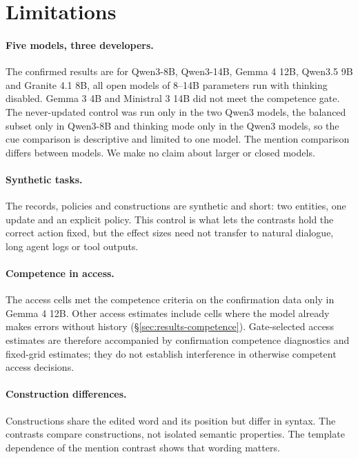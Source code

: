 \section*{Limitations}

\paragraph{Five models, three developers.} The confirmed results are for Qwen3-8B, Qwen3-14B, Gemma 4 12B,
Qwen3.5 9B and Granite 4.1 8B, all open models of 8--14B parameters run with thinking disabled. Gemma 3 4B and
Ministral 3 14B did not meet the competence gate. The never-updated control was run only in the two Qwen3
models, the balanced subset only in Qwen3-8B and thinking mode only in the Qwen3 models, so the cue comparison
is descriptive and limited to one model. The mention comparison differs between models. We make no claim about larger or closed models.

\paragraph{Synthetic tasks.} The records, policies and constructions are synthetic and short: two
entities, one update and an explicit policy. This control is what lets the contrasts hold the correct
action fixed, but the effect sizes need not transfer to natural dialogue, long agent logs or tool
outputs.

\paragraph{Competence in access.} The access cells met the competence criteria on the confirmation data only in
Gemma 4 12B. Other access estimates include cells where the model already makes errors without history
(\S\ref{sec:results-competence}). Gate-selected access estimates are therefore accompanied by confirmation
competence diagnostics and fixed-grid estimates; they do not establish interference in otherwise
competent access decisions.

\paragraph{Construction differences.} Constructions share the edited word and its position but differ in
syntax. The contrasts compare constructions, not isolated semantic properties. The template dependence of
the mention contrast shows that wording matters.


